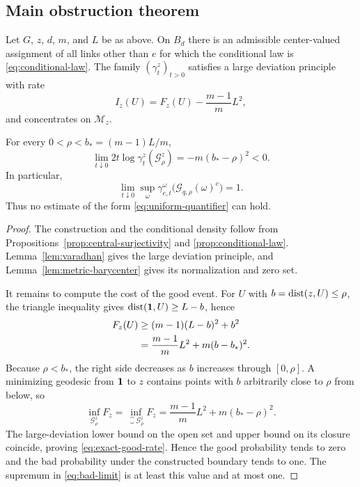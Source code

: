 \subsection{Main obstruction theorem}

\begin{theorem}\label{thm:central-obstruction}
Let $G$, $z$, $d$, $m$, and $L$ be as above.  On $B_d$ there is an admissible
center-valued assignment of all links other than $e$ for which the
conditional law is \eqref{eq:conditional-law}.  The family
$(\gamma_t^z)_{t>0}$ satisfies a large deviation principle with rate
\begin{equation}\label{eq:normalized-rate}
  I_z(U)=F_z(U)-\frac{m-1}{m}L^2,
\end{equation}
and concentrates on $\mathcal M_z$.

For every $0<\rho<b_*=(m-1)L/m$,
\begin{equation}\label{eq:exact-good-rate}
 \lim_{t\downarrow0}2t\log\gamma_t^z(\mathcal G_\rho^z)
 =-m(b_*-\rho)^2<0.
\end{equation}
In particular,
\begin{equation}\label{eq:bad-limit}
 \lim_{t\downarrow0}
 \sup_{\omega}
 \gamma_{e,t}^{\omega}
 \bigl(\mathcal G_{q,\rho}(\omega)^c\bigr)=1.
\end{equation}
Thus no estimate of the form \eqref{eq:uniform-quantifier} can hold.
\end{theorem}

\begin{proof}
The construction and the conditional density follow from
Propositions~\ref{prop:central-surjectivity} and
\ref{prop:conditional-law}.  Lemma~\ref{lem:varadhan} gives the large
deviation principle, and Lemma~\ref{lem:metric-barycenter} gives its
normalization and zero set.

It remains to compute the cost of the good event.  For $U$ with
$b=\operatorname{dist}(z,U)\leq\rho$, the triangle inequality gives
$\operatorname{dist}(\mathbf 1,U)\geq L-b$, hence
\begin{align}
 F_z(U)
 &\geq (m-1)(L-b)^2+b^2 \notag\\
 &=\frac{m-1}{m}L^2+m(b-b_*)^2.\label{eq:good-lower-bound}
\end{align}
Because $\rho<b_*$, the right side decreases as $b$ increases through
$[0,\rho]$.  A minimizing geodesic from $\mathbf 1$ to $z$ contains points with
$b$ arbitrarily close to $\rho$ from below, so
\begin{equation}\label{eq:good-infima}
 \inf_{\mathcal G_\rho^z}F_z
 =\inf_{\closure{\mathcal G_\rho^z}}F_z
 =\frac{m-1}{m}L^2+m(b_*-\rho)^2.
\end{equation}
The large-deviation lower bound on the open set and upper bound on its
closure coincide, proving \eqref{eq:exact-good-rate}.  Hence the good
probability tends to zero and the bad probability under the constructed
boundary tends to one.  The supremum in \eqref{eq:bad-limit} is at least this
value and at most one.
\end{proof}

